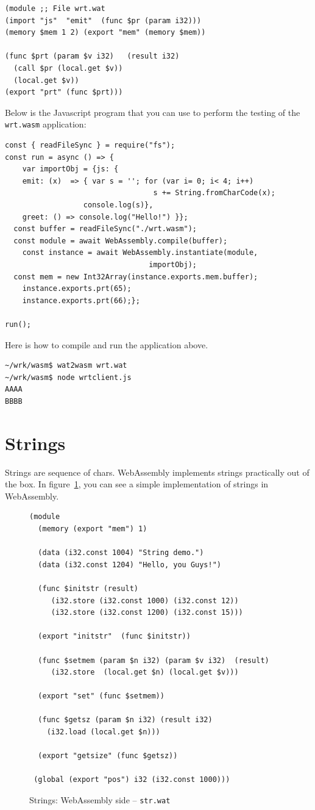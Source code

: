 \documentclass[a4paper,12pt]{book}
\begin{document}
\begin{verbatim}
(module ;; File wrt.wat
(import "js"  "emit"  (func $pr (param i32)))
(memory $mem 1 2) (export "mem" (memory $mem))

(func $prt (param $v i32)   (result i32)
  (call $pr (local.get $v))
  (local.get $v))
(export "prt" (func $prt)))
\end{verbatim}

Below is the Javascript program that you can use
to perform the testing of the \verb|wrt.wasm|
application:

\begin{verbatim}
const { readFileSync } = require("fs");
const run = async () => {
    var importObj = {js: {
	emit: (x)  => { var s = ''; for (var i= 0; i< 4; i++)
	                              s += String.fromCharCode(x);
                  console.log(s)},
	greet: () => console.log("Hello!") }};
  const buffer = readFileSync("./wrt.wasm");
  const module = await WebAssembly.compile(buffer);
    const instance = await WebAssembly.instantiate(module, 
                                 importObj);
  const mem = new Int32Array(instance.exports.mem.buffer);
    instance.exports.prt(65);
    instance.exports.prt(66);};

run();
\end{verbatim}

Here is how to compile and run the application above.

\begin{verbatim}
~/wrk/wasm$ wat2wasm wrt.wat
~/wrk/wasm$ node wrtclient.js
AAAA
BBBB
\end{verbatim}

\section{Strings}
Strings are sequence of chars. WebAssembly
implements strings practically out of the box.
In figure~\ref{wasm:strings}, you can see a simple
implementation of strings in WebAssembly.
\begin{figure}[!h]
\begin{verbatim}
(module
  (memory (export "mem") 1)

  (data (i32.const 1004) "String demo.")
  (data (i32.const 1204) "Hello, you Guys!")

  (func $initstr (result)
     (i32.store (i32.const 1000) (i32.const 12))
     (i32.store (i32.const 1200) (i32.const 15)))

  (export "initstr"  (func $initstr))
 
  (func $setmem (param $n i32) (param $v i32)  (result)
     (i32.store  (local.get $n) (local.get $v)))
  
  (export "set" (func $setmem))

  (func $getsz (param $n i32) (result i32)
    (i32.load (local.get $n)))

  (export "getsize" (func $getsz))

 (global (export "pos") i32 (i32.const 1000)))
\end{verbatim}
  \caption{Strings: WebAssembly side -- {\tt str.wat}}
  \label{wasm:strings}
\end{figure}
\end{document}

